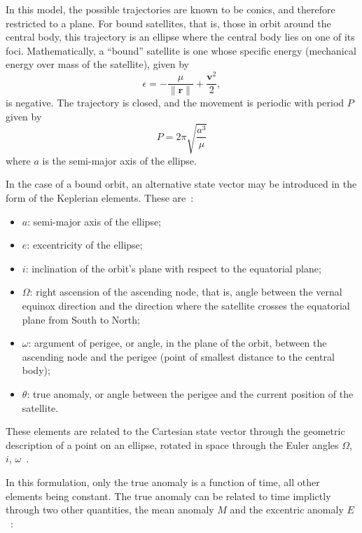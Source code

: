 In this model, the possible trajectories are known to be conics, and therefore restricted to a plane. For bound satellites, that is, those in orbit around the central body, this trajectory is an ellipse where the central body lies on one of its foci. Mathematically, a ``bound'' satellite is one whose specific energy (mechanical energy over mass of the satellite), given by~\cite{curtis2015orbital}
\begin{equation}
    \epsilon = -\frac{\mu}{\lVert \mathbf{r} \rVert} + \frac{\mathbf{v}^2}{2},
\end{equation}
is negative. The trajectory is closed, and the movement is periodic with period \(P\) given by~\cite{curtis2015orbital}
\begin{equation}
    P = 2\pi \sqrt{\frac{a^3}{\mu}}
\end{equation}
where \(a\) is the semi-major axis of the ellipse.

In the case of a bound orbit, an alternative state vector may be introduced in the form of the Keplerian elements. These are~\cite{curtis2015orbital}:
\begin{itemize}
    \item \(a\): semi-major axis of the ellipse;
    \item \(e\): excentricity of the ellipse;
    \item \(i\): inclination of the orbit's plane with respect to the equatorial plane;
    \item \(\Omega \): right ascension of the ascending node, that is, angle between the vernal equinox direction and the direction where the satellite crosses the equatorial plane from South to North;
    \item \(\omega \): argument of perigee, or angle, in the plane of the orbit, between the ascending node and the perigee (point of smallest distance to the central body);
    \item \(\theta \): true anomaly, or angle between the perigee and the current position of the satellite.
\end{itemize}

These elements are related to the Cartesian state vector through the geometric description of a point on an ellipse, rotated in space through the Euler angles \(\Omega\), \(i\), \(\omega\)~\cite{curtis2015orbital}.


In this formulation, only the true anomaly is a function of time, all other elements being constant. The true anomaly can be related to time implictly through two other quantities, the mean anomaly \(M\) and the excentric anomaly \(E\)~\cite{curtis2015orbital}:

